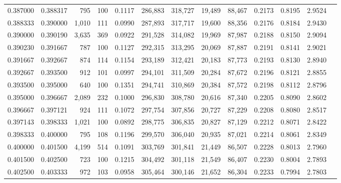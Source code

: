 \begin{tabular}{rrrrrrrrrrrrr}
0.387000 & 0.388317 &   795 & 100 &                                     0.1117 & 286,883 & 318,727 &  19,489 &  88,467 & 0.2173 & 0.8195 & 2.9524 \\
0.388333 & 0.390000 & 1,010 & 111 &                                     0.0990 & 287,893 & 317,717 &  19,600 &  88,356 & 0.2176 & 0.8184 & 2.9430 \\
0.390000 & 0.390190 & 3,635 & 369 &                                     0.0922 & 291,528 & 314,082 &  19,969 &  87,987 & 0.2188 & 0.8150 & 2.9094 \\
0.390230 & 0.391667 &   787 & 100 &                                     0.1127 & 292,315 & 313,295 &  20,069 &  87,887 & 0.2191 & 0.8141 & 2.9021 \\
0.391667 & 0.392667 &   874 & 114 &                                     0.1154 & 293,189 & 312,421 &  20,183 &  87,773 & 0.2193 & 0.8130 & 2.8940 \\
0.392667 & 0.393500 &   912 & 101 &                                     0.0997 & 294,101 & 311,509 &  20,284 &  87,672 & 0.2196 & 0.8121 & 2.8855 \\
0.393500 & 0.395000 &   640 & 100 &                                     0.1351 & 294,741 & 310,869 &  20,384 &  87,572 & 0.2198 & 0.8112 & 2.8796 \\
0.395000 & 0.396667 & 2,089 & 232 &                                     0.1000 & 296,830 & 308,780 &  20,616 &  87,340 & 0.2205 & 0.8090 & 2.8602 \\
0.396667 & 0.397121 &   924 & 111 &                                     0.1072 & 297,754 & 307,856 &  20,727 &  87,229 & 0.2208 & 0.8080 & 2.8517 \\
0.397143 & 0.398333 & 1,021 & 100 &                                     0.0892 & 298,775 & 306,835 &  20,827 &  87,129 & 0.2212 & 0.8071 & 2.8422 \\
0.398333 & 0.400000 &   795 & 108 &                                     0.1196 & 299,570 & 306,040 &  20,935 &  87,021 & 0.2214 & 0.8061 & 2.8349 \\
0.400000 & 0.401500 & 4,199 & 514 &                                     0.1091 & 303,769 & 301,841 &  21,449 &  86,507 & 0.2228 & 0.8013 & 2.7960 \\
0.401500 & 0.402500 &   723 & 100 &                                     0.1215 & 304,492 & 301,118 &  21,549 &  86,407 & 0.2230 & 0.8004 & 2.7893 \\
0.402500 & 0.403333 &   972 & 103 &                                     0.0958 & 305,464 & 300,146 &  21,652 &  86,304 & 0.2233 & 0.7994 & 2.7803 \\

\end{tabular}
